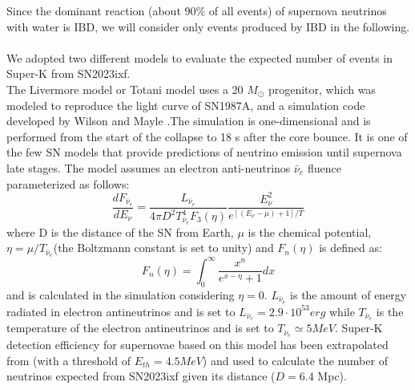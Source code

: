 \documentclass[twocolumn]{aastex631}
\begin{document}
Since the dominant reaction (about 90\% of all events) of supernova neutrinos with water is IBD, we will consider only events produced by IBD in the following. \\ \\
We adopted two different models to evaluate the expected number of events in Super-K from SN2023ixf.\\
The Livermore model or Totani model \citep{art:Totani_1998} uses a 20 $M_{\odot}$ progenitor, which was modeled to reproduce the light curve of SN1987A, and a simulation code developed by Wilson and Mayle \citep{art:Wilson1986,art:Mayle1987}.The simulation is one-dimensional and is performed from the start of the collapse to 18 s after the core bounce. It is one of the few SN models that provide predictions of neutrino emission until supernova late stages. The model assumes an electron anti-neutrinos $\bar{\nu}_e$ fluence parameterized as follows: 
\begin{equation}
     \dfrac{dF_{\bar{\nu}_e}}{dE_{\nu}} = \dfrac{L_{\bar{\nu}_e}}{4\pi D^2T^4_{\bar{\nu}_e}F_3(\eta)}\dfrac{E_{\nu}^2}{e^{[(E_{\nu}-\mu)+1]/T}}
\end{equation}
where D is the distance of the SN from Earth, $\mu$ is the chemical potential, $\eta=\mu/T_{\bar{\nu}_e}$(the Boltzmann constant is set to unity) and $F_n(\eta)$ is defined as: 
\begin{equation}
    F_n(\eta) = \int_0^{\infty}\dfrac{x^n}{e^{x-\eta}+1}dx 
\end{equation}
and is calculated in the simulation considering $\eta=0$. $L_{\bar{\nu}_e}$ 
is the  amount of energy radiated in electron antineutrinos and is set to $L_{\bar{\nu}_e}=2.9\cdot 10^{53} erg$ while  $T_{\bar{\nu}_e}$ is the temperature of the electron antineutrinos  and is set to $T_{\bar{\nu}_e}\simeq5 MeV$.
Super-K detection efficiency for supernovae based on this model has been extrapolated from \cite{art:ikeda} (with a threshold of $E_{th}=4.5 MeV$) and used to calculate the number of neutrinos expected from SN2023ixf given its distance ($D=6.4$ Mpc). 
\end{document}
